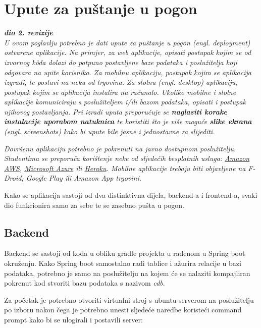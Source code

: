 			\eject 
		
		\section{Upute za puštanje u pogon}
		
			\textbf{\textit{dio 2. revizije}}\\
		
			 \textit{U ovom poglavlju potrebno je dati upute za puštanje u pogon (engl. deployment) ostvarene aplikacije. Na primjer, za web aplikacije, opisati postupak kojim se od izvornog kôda dolazi do potpuno postavljene baze podataka i poslužitelja koji odgovara na upite korisnika. Za mobilnu aplikaciju, postupak kojim se aplikacija izgradi, te postavi na neku od trgovina. Za stolnu (engl. desktop) aplikaciju, postupak kojim se aplikacija instalira na računalo. Ukoliko mobilne i stolne aplikacije komuniciraju s poslužiteljem i/ili bazom podataka, opisati i postupak njihovog postavljanja. Pri izradi uputa preporučuje se \textbf{naglasiti korake instalacije uporabom natuknica} te koristiti što je više moguće \textbf{slike ekrana} (engl. screenshots) kako bi upute bile jasne i jednostavne za slijediti.}
			
			
			 \textit{Dovršenu aplikaciju potrebno je pokrenuti na javno dostupnom poslužitelju. Studentima se preporuča korištenje neke od sljedećih besplatnih usluga: \href{https://aws.amazon.com/}{Amazon AWS}, \href{https://azure.microsoft.com/en-us/}{Microsoft Azure} ili \href{https://www.heroku.com/}{Heroku}. Mobilne aplikacije trebaju biti objavljene na F-Droid, Google Play ili Amazon App trgovini.}

            {Kako se aplikacija sastoji od dva distinktivna dijela, backend-a i frontend-a, svaki dio funkcionira samo za sebe te se zasebno pušta u pogon.}

			\subsection{Backend}

                {Backend se sastoji od koda u obliku gradle projekta u rađenom u Spring boot okruženju. Kako Spring boot samostalno radi tablice i ažurira relacije u bazi podataka, potrebno je samo na poslužitelju na kojem će se nalaziti kompajliran pokrenut kod stvoriti bazu podataka s nazivom \textit{cdb}.}
                
                {Za početak je potrebno otvoriti virtualni stroj s ubuntu serverom na poslužitelju po izboru nakon čega je potrebno unesti sljedeće naredbe koristeći command prompt kako bi se ulogirali i postavili server:}

